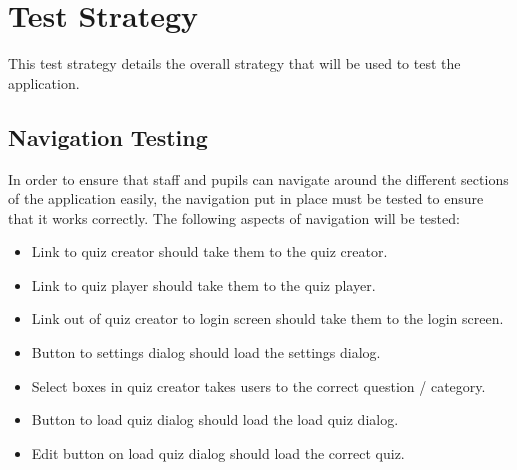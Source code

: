 \section{Test Strategy}
This test strategy details the overall strategy that will be used to test the application.

\subsection{Navigation Testing}
In order to ensure that staff and pupils can navigate around the different sections of the application easily, the navigation put in place must be tested to ensure that it works correctly. The following aspects of navigation will be tested:

\begin{itemize}
\item Link to quiz creator should take them to the quiz creator.
\item Link to quiz player should take them to the quiz player.
\item Link out of quiz creator to login screen should take them to the login screen.
\item Button to settings dialog should load the settings dialog.
\item Select boxes in quiz creator takes users to the correct question / category.
\item Button to load quiz dialog should load the load quiz dialog.
\item Edit button on load quiz dialog should load the correct quiz.
\end{itemize}

